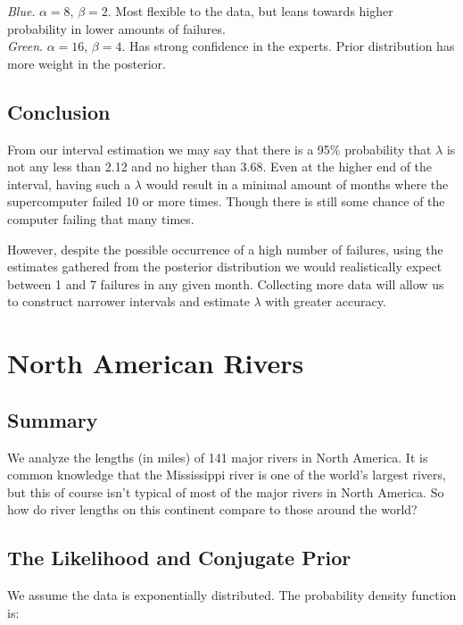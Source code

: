 \documentclass[12pt]{article}
\begin{document}
\noindent \textit{Blue}. $\alpha=8$, $\beta=2$.  Most flexible to the data, but leans towards higher probability in lower amounts of failures.  \\ [-0.3cm]

\noindent \textit{Green}. $\alpha=16$, $\beta=4$.  Has strong confidence in the experts.  Prior distribution has more weight in the posterior.


\subsection{Conclusion}

\noindent From our interval estimation we may say that there is a 95\% probability that $\lambda$ is not any less than 2.12 and no higher than 3.68.  Even at the higher end of the interval, having such a $\lambda$ would result in a minimal amount of months where the supercomputer failed 10 or more times.  Though there is still some chance of the computer failing that many times.
\bigskip

\noindent However, despite the possible occurrence of a high number of failures, using the estimates gathered from the posterior distribution we would realistically expect between 1 and 7 failures in any given month.  Collecting more data will allow us to construct narrower intervals and estimate $\lambda$ with greater accuracy.

\newpage

\section{North American Rivers}

\subsection{Summary}

\noindent We analyze the lengths (in miles) of 141 major rivers in North America.  It is common knowledge that the Mississippi river is one of the world's largest rivers, but this of course isn't typical of most of the major rivers in North America.  So how do river lengths on this continent compare to those around the world?

\subsection{The Likelihood and Conjugate Prior}

\noindent We assume the data is exponentially distributed.  The probability density function is:
\end{document}
